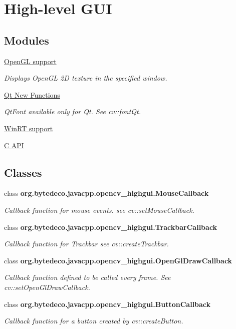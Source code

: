 \hypertarget{group__highgui}{}\section{High-\/level G\+UI}
\label{group__highgui}
\subsection*{Modules}
\begin{DoxyCompactItemize}
\item 
\hyperlink{group__highgui__opengl}{Open\+G\+L support}
\begin{DoxyCompactList}\small\item\em Displays Open\+GL 2D texture in the specified window. \end{DoxyCompactList}\item 
\hyperlink{group__highgui__qt}{Qt New Functions}
\begin{DoxyCompactList}\small\item\em Qt\+Font available only for Qt. See cv\+::font\+Qt. \end{DoxyCompactList}\item 
\hyperlink{group__highgui__winrt}{Win\+R\+T support}
\item 
\hyperlink{group__highgui__c}{C A\+PI}
\end{DoxyCompactItemize}
\subsection*{Classes}
\begin{DoxyCompactItemize}
\item 
class {\bfseries org.\+bytedeco.\+javacpp.\+opencv\+\_\+highgui.\+Mouse\+Callback}
\begin{DoxyCompactList}\small\item\em Callback function for mouse events. see cv\+::set\+Mouse\+Callback. \end{DoxyCompactList}\item 
class {\bfseries org.\+bytedeco.\+javacpp.\+opencv\+\_\+highgui.\+Trackbar\+Callback}
\begin{DoxyCompactList}\small\item\em Callback function for Trackbar see cv\+::create\+Trackbar. \end{DoxyCompactList}\item 
class {\bfseries org.\+bytedeco.\+javacpp.\+opencv\+\_\+highgui.\+Open\+Gl\+Draw\+Callback}
\begin{DoxyCompactList}\small\item\em Callback function defined to be called every frame. See cv\+::set\+Open\+Gl\+Draw\+Callback. \end{DoxyCompactList}\item 
class {\bfseries org.\+bytedeco.\+javacpp.\+opencv\+\_\+highgui.\+Button\+Callback}
\begin{DoxyCompactList}\small\item\em Callback function for a button created by cv\+::create\+Button. \end{DoxyCompactList}\end{DoxyCompactItemize}

